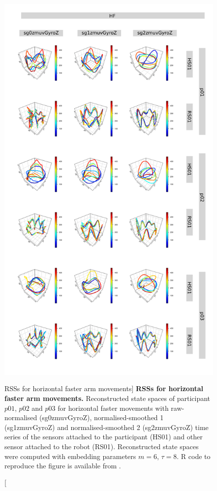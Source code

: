 \begin{figure}
\centering
\includegraphics[height=0.85\textheight]{rss_HF}
\caption
	[RSSs for horizontal faster arm movements]{
	{\bf RSSs for horizontal faster arm movements.}
	Reconstructed state spaces %
	of participant $p01$, $p02$ and $p03$ for horizontal faster movements 
	with raw-normalised (sg0zmuvGyroZ), 
	normalised-smoothed 1 (sg1zmuvGyroZ) and 
	normalised-smoothed 2 (sg2zmuvGyroZ) time series of the 
	sensors attached to the participant (HS01) and other sensor 
	attached to the robot (RS01).	
	Reconstructed state spaces were computed with 
	embedding parameters $m=6$, $\tau=8$.
	R code to reproduce the figure is available from \cite{hwum2018}.
        }
    \label{fig:rss_HF}
\end{figure}



